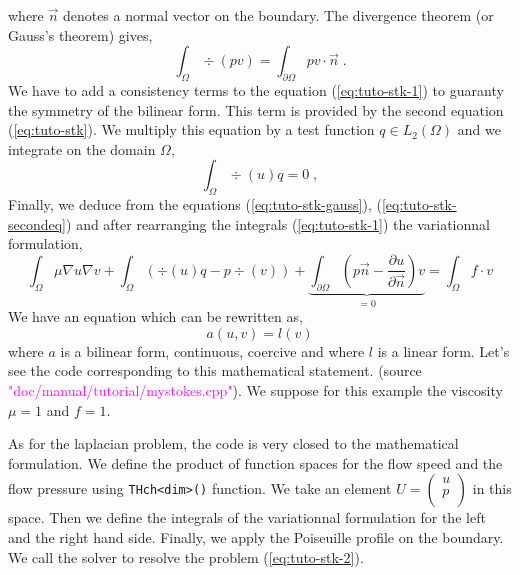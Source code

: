 %
where $\vec n$ denotes a normal vector on the boundary.
The divergence theorem (or Gauss's theorem) gives,
%
\begin{equation}
\int_\Omega \div(pv) = \int_{\partial\Omega} pv\cdot \vec n\;.
\label{eq:tuto-stk-gauss}
\end{equation}
%
We have to add a consistency terms to the equation (\ref{eq:tuto-stk-1}) to
guaranty the symmetry of the bilinear form.
This term is provided by the second equation (\ref{eq:tuto-stk}). We multiply this equation
by a test function $q\in L_2(\Omega)$ and we integrate on the domain $\Omega$,
%
\begin{equation}
\int_{\Omega} \div(u) q = 0 \;,
\label{eq:tuto-stk-secondeq}
\end{equation}
%
Finally, we deduce from the equations (\ref{eq:tuto-stk-gauss}), (\ref{eq:tuto-stk-secondeq})
and after rearranging the integrals (\ref{eq:tuto-stk-1}) the variationnal formulation,
%
\begin{equation}
\int_\Omega \mu \nabla u \nabla v
+\int_\Omega \left( \div(u) q - p \div(v) \right)
+\underbrace{
    \int_{\partial\Omega} \left( p\vec n - \frac{\partial u}{\partial \vec n} \right) v
  }_{=0}
=\int_\Omega f \cdot v 
\label{eq:tuto-stk-varform}
\end{equation}
%
We have an equation which can be rewritten as,
\begin{equation}
    a(u,v) = l(v)
\label{eq:tuto-stk-2}
\end{equation}
%
where $a$ is a bilinear form, continuous, coercive and where $l$ is a linear form.
Let's see the \feel code corresponding to this mathematical statement.
(source \textcolor{magenta}{"doc/manual/tutorial/mystokes.cpp"}).
We suppose for this example the viscosity $\mu=1$ and $f=1$.
%
\vspace{2mm}

\vspace{2mm}
%
As for the laplacian problem, the code is very closed to the mathematical formulation.
We define the product of function spaces for the flow speed and the flow pressure
using \lstinline!THch<dim>()! function.
We take an element 
$U=\left(
    \begin{array}{c}
        u \\
        p \\
    \end{array}
\right)
$
in this space. Then we define the integrals of the variationnal formulation
for the left and the right hand side. Finally, we apply the Poiseuille profile on the boundary.
We call the solver to resolve the problem (\ref{eq:tuto-stk-2}).



